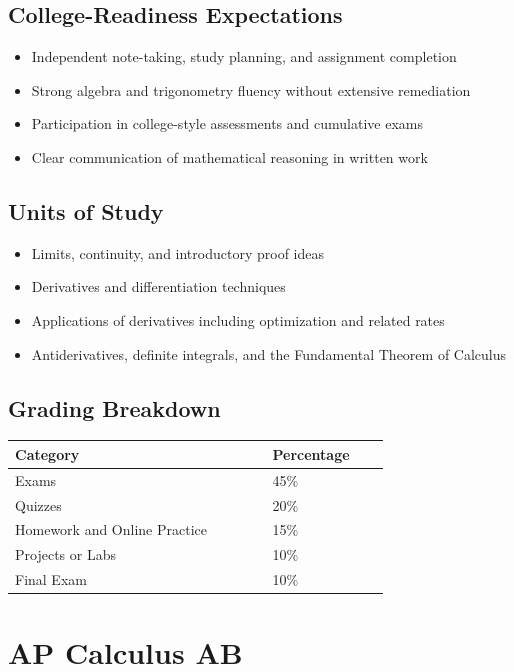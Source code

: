 \documentclass[12pt,oneside]{book}
\begin{document}
\section{College-Readiness Expectations}
\begin{itemize}[leftmargin=2em]
    \item Independent note-taking, study planning, and assignment completion
    \item Strong algebra and trigonometry fluency without extensive remediation
    \item Participation in college-style assessments and cumulative exams
    \item Clear communication of mathematical reasoning in written work
\end{itemize}

\section{Units of Study}
\begin{itemize}[leftmargin=2em]
    \item Limits, continuity, and introductory proof ideas
    \item Derivatives and differentiation techniques
    \item Applications of derivatives including optimization and related rates
    \item Antiderivatives, definite integrals, and the Fundamental Theorem of Calculus
\end{itemize}

\section{Grading Breakdown}
\begin{center}
\begin{tabular}{L{0.55\linewidth}L{0.25\linewidth}}
\toprule
\textbf{Category} & \textbf{Percentage} \\
\midrule
Exams & 45\% \\
Quizzes & 20\% \\
Homework and Online Practice & 15\% \\
Projects or Labs & 10\% \\
Final Exam & 10\% \\
\bottomrule
\end{tabular}
\end{center}

\chapter{AP Calculus AB}
\end{document}
